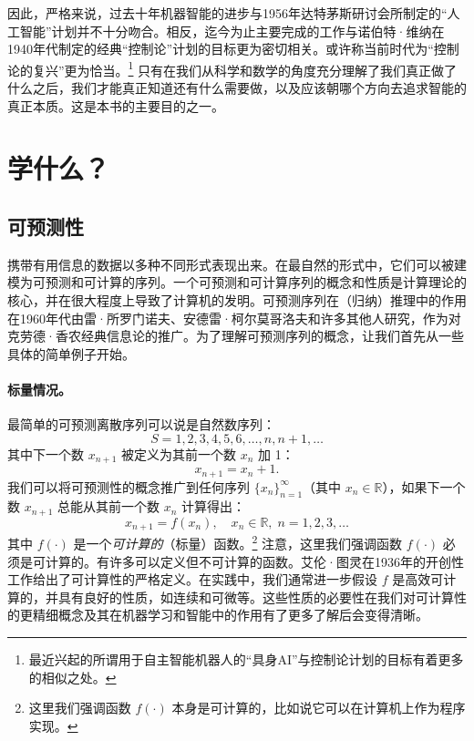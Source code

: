 \documentclass[../../book-main.tex]{subfiles}
\begin{document}
因此，严格来说，过去十年机器智能的进步与1956年达特茅斯研讨会所制定的“人工智能”计划并不十分吻合。相反，迄今为止主要完成的工作与诺伯特·维纳在1940年代制定的经典“控制论”计划的目标更为密切相关。或许称当前时代为“控制论的复兴”更为恰当。\footnote{最近兴起的所谓用于自主智能机器人的“具身AI”与控制论计划的目标有着更多的相似之处。} 只有在我们从科学和数学的角度充分理解了我们真正做了什么之后，我们才能真正知道还有什么需要做，以及应该朝哪个方向去追求智能的真正本质。这是本书的主要目的之一。


\section{学什么？}
\label{sec:what-to-learn}



\subsection{可预测性}
\label{sec:predictability}
携带有用信息的数据以多种不同形式表现出来。在最自然的形式中，它们可以被建模为可预测和可计算的序列。一个可预测和可计算序列的概念和性质是计算理论的核心，并在很大程度上导致了计算机的发明\cite{Turing-1936}。可预测序列在（归纳）推理中的作用在1960年代由雷·所罗门诺夫、安德雷·柯尔莫哥洛夫和许多其他人研究\cite{Kolmogorov1998OnTO}，作为对克劳德·香农经典信息论\cite{Shannon-1948}的推广。为了理解可预测序列的概念，让我们首先从一些具体的简单例子开始。
\paragraph{标量情况。} 最简单的可预测离散序列可以说是自然数序列：
\begin{equation}
   {S} =  1, 2, 3, 4, 5, 6, \ldots, n, n+1, \ldots
\end{equation}
其中下一个数 $x_{n+1}$ 被定义为其前一个数 $x_n$ 加 1：
\begin{equation}
x_{n+1} = x_n + 1.    
\end{equation}
我们可以将可预测性的概念推广到任何序列 $\{x_n\}_{n=1}^\infty$（其中 $x_n \in \mathbb{R}$），如果下一个数 $x_{n+1}$ 总能从其前一个数 $x_n$ 计算得出：
\begin{equation}
    x_{n+1} = f(x_{n}), \quad x_n \in \mathbb{R}, \; n =  1, 2, 3, \ldots
\end{equation}
其中 $f(\cdot)$ 是一个{\em 可计算的}（标量）函数。\footnote{这里我们强调函数 $f(\cdot)$ 本身是可计算的，比如说它可以在计算机上作为程序实现。} 注意，这里我们强调函数 $f(\cdot)$ 必须是可计算的。有许多可以定义但不可计算的函数。艾伦·图灵在1936年的开创性工作\cite{Turing-1936}给出了可计算性的严格定义。在实践中，我们通常进一步假设 $f$ 是高效可计算的，并具有良好的性质，如连续和可微等。这些性质的必要性在我们对可计算性的更精细概念及其在机器学习和智能中的作用有了更多了解后会变得清晰。
\end{document}
